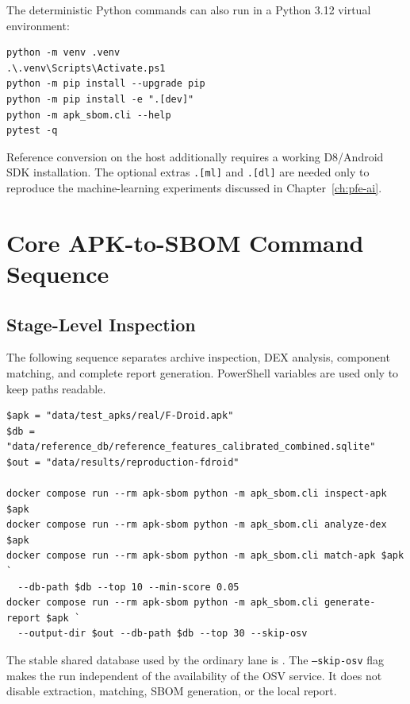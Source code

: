 The deterministic Python commands can also run in a Python 3.12 virtual
environment:

\begin{lstlisting}[style=thesiscode,
caption={Host-Python setup and test sequence.}]
python -m venv .venv
.\.venv\Scripts\Activate.ps1
python -m pip install --upgrade pip
python -m pip install -e ".[dev]"
python -m apk_sbom.cli --help
pytest -q
\end{lstlisting}

Reference conversion on the host additionally requires a working D8/Android
SDK installation. The optional extras \texttt{.[ml]} and \texttt{.[dl]} are
needed only to reproduce the machine-learning experiments discussed in
Chapter~\ref{ch:pfe-ai}.

\section{Core APK-to-SBOM Command Sequence}

\subsection{Stage-Level Inspection}

The following sequence separates archive inspection, DEX analysis, component
matching, and complete report generation. PowerShell variables are used only
to keep paths readable.

\begin{lstlisting}[style=thesiscode,
caption={Deterministic APK analysis and report workflow.}]
$apk = "data/test_apks/real/F-Droid.apk"
$db = "data/reference_db/reference_features_calibrated_combined.sqlite"
$out = "data/results/reproduction-fdroid"

docker compose run --rm apk-sbom python -m apk_sbom.cli inspect-apk $apk
docker compose run --rm apk-sbom python -m apk_sbom.cli analyze-dex $apk
docker compose run --rm apk-sbom python -m apk_sbom.cli match-apk $apk `
  --db-path $db --top 10 --min-score 0.05
docker compose run --rm apk-sbom python -m apk_sbom.cli generate-report $apk `
  --output-dir $out --db-path $db --top 30 --skip-osv
\end{lstlisting}

The stable shared database used by the ordinary lane is
.
The \texttt{--skip-osv} flag makes the run independent of the availability of
the OSV service. It does not disable extraction, matching, SBOM generation, or
the local report.

